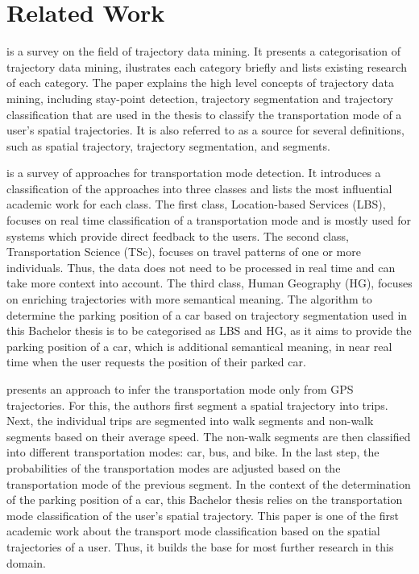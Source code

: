 \section{Related Work}

\cite{Zheng:2015:TDM:2764959.2743025} is a survey on the field of trajectory data mining. It presents a categorisation of trajectory data mining, ilustrates each category briefly and lists existing research of each category.\newline
The paper explains the high level concepts of trajectory data mining, including stay-point detection, trajectory segmentation and trajectory classification that are used in the thesis to classify the transportation mode of a user's spatial trajectories. It is also referred to as a source for several definitions, such as spatial trajectory, trajectory segmentation, and segments.

\cite{Prelipcean2017} is a survey of approaches for transportation mode detection. It introduces a classification of the approaches into three classes and lists the most influential academic work for each class. The first class, Location-based Services (LBS), focuses on real time classification of a transportation mode and is mostly used for systems which provide direct feedback to the users. The second class, Transportation Science (TSc), focuses on travel patterns of one or more individuals. Thus, the data does not need to be processed in real time and can take more context into account. The third class, Human Geography (HG), focuses on enriching trajectories with more semantical meaning.\newline
The algorithm to determine the parking position of a car based on trajectory segmentation used in this Bachelor thesis is to be categorised as LBS and HG, as it aims to provide the parking position of a car, which is additional semantical meaning, in near real time when the user requests the position of their parked car. 

\cite{Zheng2008} presents an approach to infer the transportation mode only from GPS trajectories. For this, the authors first segment a spatial trajectory into trips. Next, the individual trips are segmented into walk segments and non-walk segments based on their average speed. The non-walk segments are then classified into different transportation modes: car, bus, and bike. In the last step, the probabilities of the transportation modes are adjusted based on the transportation mode of the previous segment. \newline
In the context of the determination of the parking position of a car, this Bachelor thesis relies on the transportation mode classification of the user's spatial trajectory. This paper is one of the first academic work about the transport mode classification based on the spatial trajectories of a user. Thus, it builds the base for most further research in this domain.

